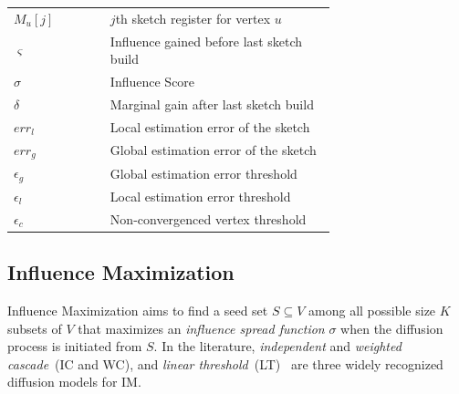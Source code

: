 \documentclass[final,5p,times,twocolumn]{elsarticle}
\newcommand\fixme[1]{#1}
\begin{document}
\begin{table}[!ht]
\begin{small}
\begin{tabular}{|l|p{0.7\linewidth}|}
        $M_u[j]$        & $j$th sketch register for vertex $u$\\
        $\varsigma $    & Influence gained before last sketch build\\
        $\sigma $       & Influence Score\\
        $\delta$        & Marginal gain after last sketch build\\
        $err_l$         & Local estimation error of the sketch\\
        $err_g$         & Global estimation error of the sketch\\
        $\epsilon_{g}$    & Global estimation error threshold\\
        $\epsilon_{l}$    & Local estimation error threshold\\ 
        $\epsilon_{c}$    & Non-convergenced vertex threshold\\
        \hline         
    \end{tabular}
    \end{small}
\end{table}
\subsection{Influence Maximization}

Influence Maximization aims to find a seed set $S \subseteq V$ among \fixme{all possible size $K$ subsets of $V$ that maximizes an {\em influence spread function} $\sigma$  when the diffusion process is initiated from $S$.} %
In the literature, {\em independent} and {\em weighted cascade}~(IC and WC), and 
{\em linear threshold}~(LT)~\cite{kempe2003maximizing} are three widely recognized diffusion models for IM.
\end{document}

